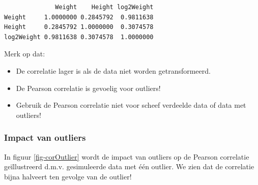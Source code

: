 \documentclass[
  dutch,
  letterpaper,
  12pt]{book}
\providecommand{\tightlist}{%
  \setlength{\itemsep}{0pt}\setlength{\parskip}{0pt}}
\theoremstyle{definition}
\theoremstyle{definition}
\theoremstyle{definition}
\theoremstyle{remark}
\begin{document}
\begin{verbatim}
              Weight    Height log2Weight
Weight     1.0000000 0.2845792  0.9811638
Height     0.2845792 1.0000000  0.3074578
log2Weight 0.9811638 0.3074578  1.0000000
\end{verbatim}

Merk op dat:

\begin{itemize}
\tightlist
\item
  De correlatie lager is als de data niet worden getransformeerd.
\item
  De Pearson correlatie is gevoelig voor outliers!
\item
  Gebruik de Pearson correlatie niet voor scheef verdeelde data of data
  met outliers!
\end{itemize}

\subsubsection{Impact van outliers}\label{impact-van-outliers}

In figuur \ref{fig-corOutlier} wordt de impact van outliers op de
Pearson correlatie geïllustreerd d.m.v. gesimuleerde data met één
outlier. We zien dat de correlatie bijna halveert ten gevolge van de
outlier!
\end{document}
